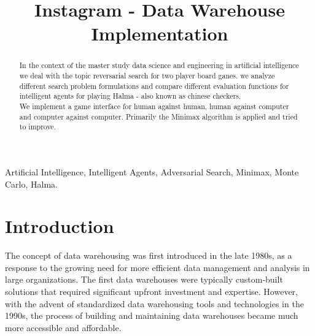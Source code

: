 \documentclass[conference]{IEEEtran}
\begin{document}
\title{\LARGE Instagram - Data Warehouse Implementation}


 \author{
 }

\maketitle

\begin{abstract}
In the context of the master study data science and engineering in artificial intelligence we deal with the topic reversarial search for two player board ganes. we analyze different search problem formulations and compare different evaluation functions for intelligent agents for playing Halma - also known as chinese checkers. \\
We implement a game interface for human against human, human against computer and computer against computer. Primarily the Minimax algorithm is applied and tried to improve.
\end{abstract}

\IEEEoverridecommandlockouts
\begin{keywords}
Artificial Intelligence, Intelligent Agents, Adversarial Search, Minimax, Monte Carlo, Halma.
\end{keywords}

\IEEEpeerreviewmaketitle



\section{Introduction}

The concept of data warehousing was first introduced in the late 1980s, as a response to the growing need for more efficient data management and analysis in large organizations. The first data warehouses were typically custom-built solutions that required significant upfront investment and expertise. However, with the advent of standardized data warehousing tools and technologies in the 1990s, the process of building and maintaining data warehouses became much more accessible and affordable.
\end{document}
